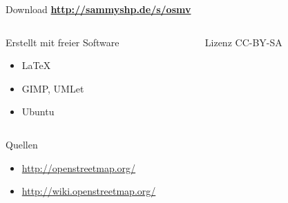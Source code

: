 \documentclass{beamer}
\begin{document}
\begin{frame}
    \begin{block}{Download}
        \centering
        \textbf{\url{http://sammyshp.de/s/osmv}}

    \end{block}

    \begin{columns}[t]
        \hspace{2mm}
        \begin{column}{6cm}
            \begin{block}{Erstellt mit freier Software}
                \scriptsize
                \begin{itemize}
                    \item \LaTeX
                    \item GIMP, UMLet
                    \item Ubuntu
                \end{itemize}
            \end{block}
        \end{column}
        
        \begin{column}{3.8cm}
            \begin{block}{Lizenz}
                \scriptsize
                CC-BY-SA
            \end{block}
        \end{column}
    \end{columns}
    
    \begin{block}{Quellen}
        \scriptsize
        \begin{itemize}
            \item \url{http://openstreetmap.org/}
            \item \url{http://wiki.openstreetmap.org/}
        \end{itemize}
    \end{block}
\end{frame}
\end{document}

